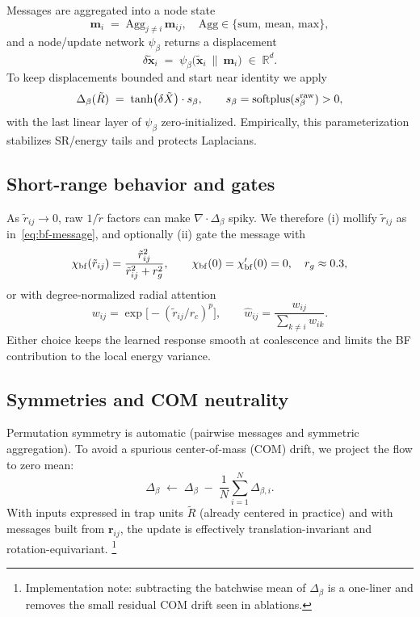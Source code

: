 Messages are aggregated into a node state
\begin{equation}
  \mathbf m_i \;=\; \mathrm{Agg}_{j\neq i}\,\mathbf m_{ij},\quad
  \mathrm{Agg}\in\{\mathrm{sum},\,\mathrm{mean},\,\mathrm{max}\},
\end{equation}
and a node/update network $\psi_\beta$ returns a displacement
\begin{equation}
  \delta\tilde{\mathbf x}_i \;=\; \psi_\beta\!\big(\tilde{\mathbf x}_i \ \| \ \mathbf m_i\big)
  \;\in\;\mathbb{R}^d.
\end{equation}
To keep displacements bounded and start near identity we apply
\begin{equation}
  \Delta_\beta(\tilde R)\;=\;\tanh\!\big(\delta\tilde X\big)\cdot s_\beta,
  \qquad s_\beta=\mathrm{softplus}(s_\beta^{\rm raw})>0,
  \label{eq:bf-bound-scale}
\end{equation}
with the last linear layer of $\psi_\beta$ zero‐initialized.
Empirically, this parameterization stabilizes SR/energy tails and protects Laplacians.

\subsection{Short-range behavior and gates}
As $\tilde r_{ij}\!\to\!0$, raw $1/\tilde r$ factors can make $\nabla\!\cdot\!\Delta_\beta$ spiky.
We therefore (i) mollify $\tilde r_{ij}$ as in~\eqref{eq:bf-message}, and optionally (ii) gate the message with
\begin{equation}
  \chi_{\rm bf}(\tilde r_{ij})=\frac{\tilde r_{ij}^2}{\tilde r_{ij}^2+r_g^2},
  \qquad \chi_{\rm bf}(0)=\chi'_{\rm bf}(0)=0,\quad r_g\approx 0.3,
  \label{eq:bf-gate}
\end{equation}
or with degree-normalized radial attention
\begin{equation}
  w_{ij}=\exp\!\big[-(\tilde r_{ij}/r_c)^p\big],\qquad
  \hat w_{ij}=\frac{w_{ij}}{\sum_{k\neq i} w_{ik}}.
\end{equation}
Either choice keeps the learned response smooth at coalescence and limits the BF contribution to the local energy variance.

\subsection{Symmetries and COM neutrality}
Permutation symmetry is automatic (pairwise messages and symmetric aggregation).
To avoid a spurious center-of-mass (COM) drift, we project the flow to zero mean:
\begin{equation}
  \Delta_\beta \;\leftarrow\; \Delta_\beta \;-\; \frac{1}{N}\sum_{i=1}^N \Delta_{\beta,i}.
  \label{eq:bf-com}
\end{equation}
With inputs expressed in trap units $\tilde R$ (already centered in practice) and with messages built from $\mathbf r_{ij}$, the update is effectively translation-invariant and rotation-equivariant.%
\footnote{Implementation note: subtracting the batchwise mean of $\Delta_\beta$ is a one-liner and removes the small residual COM drift seen in ablations.}

